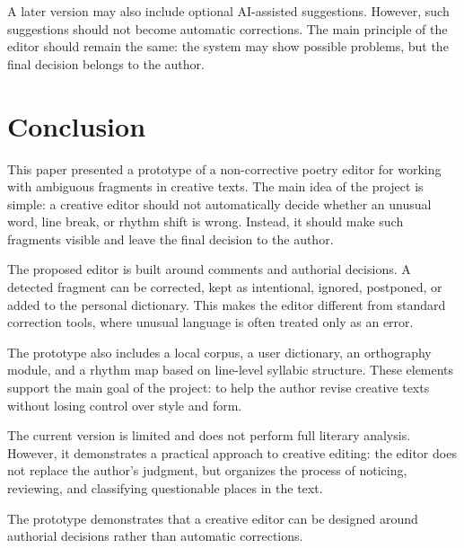 \documentclass[sigconf]{acmart}
\begin{document}
A later version may also include optional AI-assisted suggestions. However, such suggestions should not become automatic corrections. The main principle of the editor should remain the same: the system may show possible problems, but the final decision belongs to the author.

\section{Conclusion}

This paper presented a prototype of a non-corrective poetry editor for working with ambiguous fragments in creative texts. The main idea of the project is simple: a creative editor should not automatically decide whether an unusual word, line break, or rhythm shift is wrong. Instead, it should make such fragments visible and leave the final decision to the author.

The proposed editor is built around comments and authorial decisions. A detected fragment can be corrected, kept as intentional, ignored, postponed, or added to the personal dictionary. This makes the editor different from standard correction tools, where unusual language is often treated only as an error.

The prototype also includes a local corpus, a user dictionary, an orthography module, and a rhythm map based on line-level syllabic structure. These elements support the main goal of the project: to help the author revise creative texts without losing control over style and form.

The current version is limited and does not perform full literary analysis. However, it demonstrates a practical approach to creative editing: the editor does not replace the author's judgment, but organizes the process of noticing, reviewing, and classifying questionable places in the text.

The prototype demonstrates that a creative editor can be designed around authorial decisions rather than automatic corrections.
\end{document}
